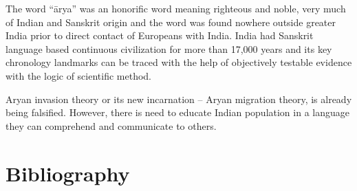 The word “ārya” was an honorific word meaning righteous and noble, very much of Indian and Sanskrit origin and the word was found nowhere outside greater India prior to direct contact of Europeans with India. India had Sanskrit language based continuous civilization for more than 17,000 years and its key chronology landmarks can be traced with the help of objectively testable evidence with the logic of scientific method.

Aryan invasion theory or its new incarnation – Aryan migration theory, is already being falsified. However, there is need to educate Indian population in a language they can comprehend and communicate to others.


\section*{Bibliography}

